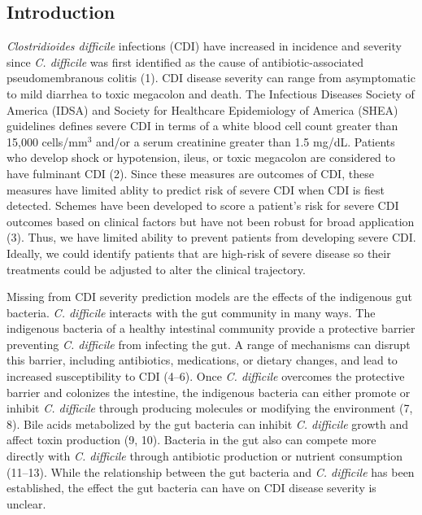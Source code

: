 \documentclass[
  12pt,
]{article}
\begin{document}
\newpage

\hypertarget{introduction}{%
\subsection{Introduction}\label{introduction}}

\emph{Clostridioides difficile} infections (CDI) have increased in
incidence and severity since \emph{C. difficile} was first identified as
the cause of antibiotic-associated pseudomembranous colitis (1). CDI
disease severity can range from asymptomatic to mild diarrhea to toxic
megacolon and death. The Infectious Diseases Society of America (IDSA)
and Society for Healthcare Epidemiology of America (SHEA) guidelines
defines severe CDI in terms of a white blood cell count greater than
15,000 cells/mm\(^3\) and/or a serum creatinine greater than 1.5 mg/dL.
Patients who develop shock or hypotension, ileus, or toxic megacolon are
considered to have fulminant CDI (2). Since these measures are outcomes
of CDI, these measures have limited ablity to predict risk of severe CDI
when CDI is fiest detected. Schemes have been developed to score a
patient's risk for severe CDI outcomes based on clinical factors but
have not been robust for broad application (3). Thus, we have limited
ability to prevent patients from developing severe CDI. Ideally, we
could identify patients that are high-risk of severe disease so their
treatments could be adjusted to alter the clinical trajectory.

Missing from CDI severity prediction models are the effects of the
indigenous gut bacteria. \emph{C. difficile} interacts with the gut
community in many ways. The indigenous bacteria of a healthy intestinal
community provide a protective barrier preventing \emph{C. difficile}
from infecting the gut. A range of mechanisms can disrupt this barrier,
including antibiotics, medications, or dietary changes, and lead to
increased susceptibility to CDI (4--6). Once \emph{C. difficile}
overcomes the protective barrier and colonizes the intestine, the
indigenous bacteria can either promote or inhibit \emph{C. difficile}
through producing molecules or modifying the environment (7, 8). Bile
acids metabolized by the gut bacteria can inhibit \emph{C. difficile}
growth and affect toxin production (9, 10). Bacteria in the gut also can
compete more directly with \emph{C. difficile} through antibiotic
production or nutrient consumption (11--13). While the relationship
between the gut bacteria and \emph{C. difficile} has been established,
the effect the gut bacteria can have on CDI disease severity is unclear.
\end{document}
